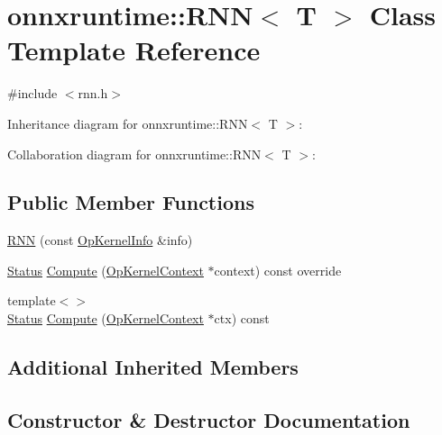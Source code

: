 \hypertarget{classonnxruntime_1_1RNN}{}\section{onnxruntime\+:\+:R\+NN$<$ T $>$ Class Template Reference}
\label{classonnxruntime_1_1RNN}


{\ttfamily \#include $<$rnn.\+h$>$}



Inheritance diagram for onnxruntime\+:\+:R\+NN$<$ T $>$\+:


Collaboration diagram for onnxruntime\+:\+:R\+NN$<$ T $>$\+:
\subsection*{Public Member Functions}
\begin{DoxyCompactItemize}
\item 
\mbox{\hyperlink{classonnxruntime_1_1RNN_acb4db50f34e9404c8282572b4204d92e}{R\+NN}} (const \mbox{\hyperlink{classonnxruntime_1_1OpKernelInfo}{Op\+Kernel\+Info}} \&info)
\item 
\mbox{\hyperlink{classonnxruntime_1_1common_1_1Status}{Status}} \mbox{\hyperlink{classonnxruntime_1_1RNN_adc74b545debd7e2060a30ca6836d6dbe}{Compute}} (\mbox{\hyperlink{classonnxruntime_1_1OpKernelContext}{Op\+Kernel\+Context}} $\ast$context) const override
\item 
{\footnotesize template$<$$>$ }\\\mbox{\hyperlink{classonnxruntime_1_1common_1_1Status}{Status}} \mbox{\hyperlink{classonnxruntime_1_1RNN_a1690908413185815adb7b182363e55cf}{Compute}} (\mbox{\hyperlink{classonnxruntime_1_1OpKernelContext}{Op\+Kernel\+Context}} $\ast$ctx) const
\end{DoxyCompactItemize}
\subsection*{Additional Inherited Members}


\subsection{Constructor \& Destructor Documentation}
\mbox{\label{classonnxruntime_1_1RNN_acb4db50f34e9404c8282572b4204d92e}} 
